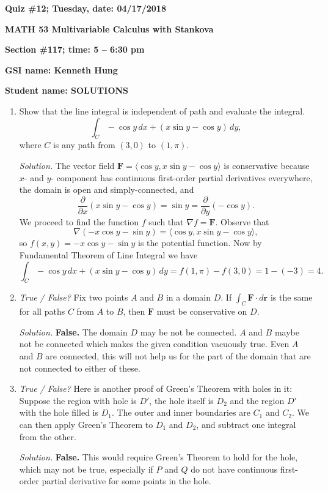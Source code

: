 \documentclass{article}
\newcommand{\rr}{\mathbf{r}}
\begin{document}
{\bf Quiz \#12; Tuesday, date: 04/17/2018}

{\bf MATH 53 Multivariable Calculus with Stankova}

{\bf Section \#117; time: 5 -- 6:30 pm}

{\bf GSI name: Kenneth Hung}

{\bf Student name: SOLUTIONS}

\vspace*{0.25in}

\begin{enumerate}
\item Show that the line integral is independent of path and evaluate the integral.
\[
\int_C -\cos y \,dx + (x \sin y - \cos y) \,dy,
\]
where $C$ is any path from $(3, 0)$ to $(1, \pi)$.

{\em Solution.} The vector field $\mathbf{F} = \langle \cos y, x \sin y - \cos y \rangle$ is conservative because $x$- and $y$- component has continuous first-order partial derivatives everywhere, the domain is open and simply-connected, and
\[
\frac{\partial}{\partial x} (x \sin y - \cos y) = \sin y = \frac{\partial}{\partial y} (-\cos y).
\]
We proceed to find the function $f$ such that $\nabla f = \mathbf{F}$. Observe that
\[
\nabla (-x \cos y - \sin y) = \langle \cos y, x \sin y - \cos y \rangle,
\]
so $f(x, y) = -x \cos y - \sin y$ is the potential function. Now by Fundamental Theorem of Line Integral we have
\[
\int_C -\cos y \,dx + (x \sin y - \cos y) \,dy = f(1, \pi) - f(3, 0) = 1 - (-3) = 4.
\]

\item {\em True / False?} Fix two points $A$ and $B$ in a domain $D$. If $\int_C \mathbf{F} \cdot d\rr$ is the same for all paths $C$ from $A$ to $B$, then $\mathbf{F}$ must be conservative on $D$.

{\em Solution.} {\bf False.} The domain $D$ may be not be connected. $A$ and $B$ maybe not be connected which makes the given condition vacuously true. Even $A$ and $B$ are connected, this will not help us for the part of the domain that are not connected to either of these.

\item {\em True / False?} Here is another proof of Green's Theorem with holes in it: Suppose the region with hole is $D'$, the hole itself is $D_2$ and the region $D'$ with the hole filled is $D_1$. The outer and inner boundaries are $C_1$ and $C_2$. We can then apply Green's Theorem to $D_1$ and $D_2$, and subtract one integral from the other.

{\em Solution.} {\bf False.} This would require Green's Theorem to hold for the hole, which may not be true, especially if $P$ and $Q$ do not have continuous first-order partial derivative for some points in the hole.
\end{enumerate}
\end{document}
